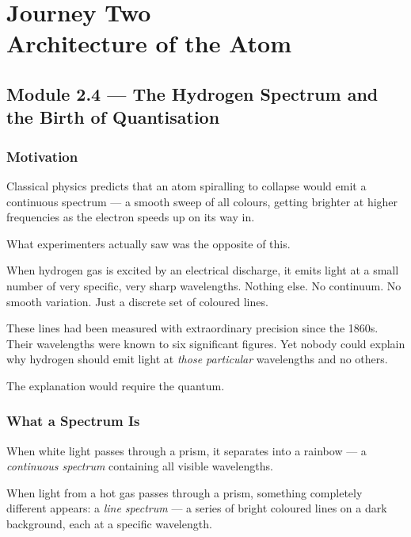 \documentclass[12pt, a4paper]{book}
\newcommand{\newterm}[1]{\textit{\textcolor{DiscoveryColor}{#1}}}
\begin{document}
\setcounter{chapter}{1}
\chapter[Journey 2 --- Architecture of the Atom]
        {Journey Two\\[8pt]
         \textcolor{ModuleColor}{\large Architecture of the Atom}}
\setcounter{section}{3}

\section{Module 2.4 --- The Hydrogen Spectrum and the Birth of Quantisation}
\label{sec:mod2.4}

\subsection*{Motivation}

Classical physics predicts that an atom spiralling to collapse
would emit a continuous spectrum --- a smooth sweep of all colours,
getting brighter at higher frequencies as the electron
speeds up on its way in.

What experimenters actually saw was the opposite of this.

When hydrogen gas is excited by an electrical discharge,
it emits light at a small number of very specific,
very sharp wavelengths.
Nothing else.
No continuum.
No smooth variation.
Just a discrete set of coloured lines.

These lines had been measured with extraordinary precision
since the 1860s.
Their wavelengths were known to six significant figures.
Yet nobody could explain why hydrogen should emit light
at \emph{those particular} wavelengths and no others.

The explanation would require the quantum.

\subsection{What a Spectrum Is}

When white light passes through a prism, it separates into
a rainbow --- a \newterm{continuous spectrum} containing
all visible wavelengths.

When light from a hot gas passes through a prism,
something completely different appears:
a \newterm{line spectrum} --- a series of bright coloured lines
on a dark background, each at a specific wavelength.
\end{document}
